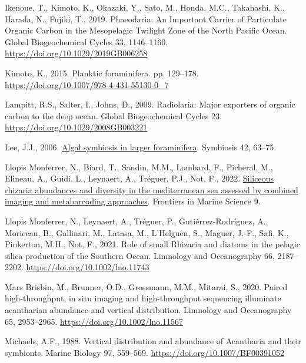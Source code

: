 \documentclass[
  letterpaper,
  DIV=11,
  numbers=noendperiod]{scrartcl}
\newlength{\cslhangindent}
\newlength{\cslentryspacingunit} %
\newenvironment{CSLReferences}[2] %
 {%
  \setlength{\parindent}{0pt}
  \ifodd #1
  \let\oldpar\par
  \def\par{\hangindent=\cslhangindent\oldpar}
  \fi
  \setlength{\parskip}{#2\cslentryspacingunit}
 }%
 {}
\begin{document}
\begin{CSLReferences}{1}{0}
\leavevmode{}%
Ikenoue, T., Kimoto, K., Okazaki, Y., Sato, M., Honda, M.C., Takahashi,
K., Harada, N., Fujiki, T., 2019. Phaeodaria: An Important Carrier of
Particulate Organic Carbon in the Mesopelagic Twilight Zone of the North
Pacific Ocean. Global Biogeochemical Cycles 33, 1146--1160.
\url{https://doi.org/10.1029/2019GB006258}

\leavevmode{}%
Kimoto, K., 2015. Planktic foraminifera. pp. 129--178.
\url{https://doi.org/10.1007/978-4-431-55130-0_7}

\leavevmode{}%
Lampitt, R.S., Salter, I., Johns, D., 2009. Radiolaria: Major exporters
of organic carbon to the deep ocean. Global Biogeochemical Cycles 23.
\url{https://doi.org/10.1029/2008GB003221}

\leavevmode{}%
Lee, J.J., 2006.
\href{https://dalspace.library.dal.ca/bitstream/handle/10222/78255/VOLUME\%2042-NUMBER\%202-2006-PAGE\%2063.pdf?sequence=1}{Algal
symbiosis in larger foraminifera}. Symbiosis 42, 63--75.

\leavevmode{}%
Llopis Monferrer, N., Biard, T., Sandin, M.M., Lombard, F., Picheral,
M., Elineau, A., Guidi, L., Leynaert, A., Tréguer, P.J., Not, F., 2022.
\href{https://www.frontiersin.org/articles/10.3389/fmars.2022.895995}{Siliceous
rhizaria abundances and diversity in the mediterranean sea assessed by
combined imaging and metabarcoding approaches}. Frontiers in Marine
Science 9.

\leavevmode{}%
Llopis Monferrer, N., Leynaert, A., Tréguer, P., Gutiérrez-Rodríguez,
A., Moriceau, B., Gallinari, M., Latasa, M., L'Helguen, S., Maguer,
J.-F., Safi, K., Pinkerton, M.H., Not, F., 2021. Role of small Rhizaria
and diatoms in the pelagic silica production of the Southern Ocean.
Limnology and Oceanography 66, 2187--2202.
\url{https://doi.org/10.1002/lno.11743}

\leavevmode{}%
Mars Brisbin, M., Brunner, O.D., Grossmann, M.M., Mitarai, S., 2020.
Paired high-throughput, in situ imaging and high-throughput sequencing
illuminate acantharian abundance and vertical distribution. Limnology
and Oceanography 65, 2953--2965. \url{https://doi.org/10.1002/lno.11567}

\leavevmode{}%
Michaels, A.F., 1988. Vertical distribution and abundance of Acantharia
and their symbionts. Marine Biology 97, 559--569.
\url{https://doi.org/10.1007/BF00391052}


\end{CSLReferences}
\end{document}
